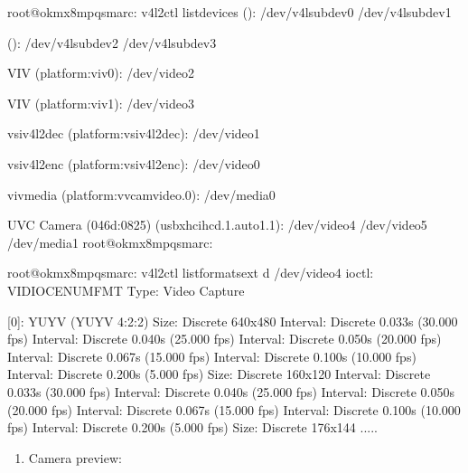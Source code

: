 \documentclass[letterpaper,10pt,openany,english]{sphinxmanual}
\begin{document}
\begin{sphinxVerbatim}[commandchars=\\\{\}]
root@ok\PYGZhy{}mx8mpq\PYGZhy{}smarc:\PYGZti{}\PYGZsh{} v4l2\PYGZhy{}ctl \PYGZhy{}\PYGZhy{}list\PYGZhy{}devices
 ():
        /dev/v4l\PYGZhy{}subdev0
        /dev/v4l\PYGZhy{}subdev1

 ():
        /dev/v4l\PYGZhy{}subdev2
        /dev/v4l\PYGZhy{}subdev3

VIV (platform:viv0):
        /dev/video2

VIV (platform:viv1):
        /dev/video3

vsi\PYGZus{}v4l2dec (platform:vsi\PYGZus{}v4l2dec):
        /dev/video1

vsi\PYGZus{}v4l2enc (platform:vsi\PYGZus{}v4l2enc):
        /dev/video0

viv\PYGZus{}media (platform:vvcam\PYGZhy{}video.0):
        /dev/media0

UVC Camera (046d:0825) (usb\PYGZhy{}xhci\PYGZhy{}hcd.1.auto\PYGZhy{}1.1):
        /dev/video4
        /dev/video5
        /dev/media1
root@ok\PYGZhy{}mx8mpq\PYGZhy{}smarc:\PYGZti{}\PYGZsh{} 

root@ok\PYGZhy{}mx8mpq\PYGZhy{}smarc:\PYGZti{}\PYGZsh{} v4l2\PYGZhy{}ctl \PYGZhy{}\PYGZhy{}list\PYGZhy{}formats\PYGZhy{}ext \PYGZhy{}d /dev/video4
ioctl: VIDIOC\PYGZus{}ENUM\PYGZus{}FMT
        Type: Video Capture

        [0]: \PYGZsq{}YUYV\PYGZsq{} (YUYV 4:2:2)
                Size: Discrete 640x480
                        Interval: Discrete 0.033s (30.000 fps)
                        Interval: Discrete 0.040s (25.000 fps)
                        Interval: Discrete 0.050s (20.000 fps)
                        Interval: Discrete 0.067s (15.000 fps)
                        Interval: Discrete 0.100s (10.000 fps)
                        Interval: Discrete 0.200s (5.000 fps)
                Size: Discrete 160x120
                        Interval: Discrete 0.033s (30.000 fps)
                        Interval: Discrete 0.040s (25.000 fps)
                        Interval: Discrete 0.050s (20.000 fps)
                        Interval: Discrete 0.067s (15.000 fps)
                        Interval: Discrete 0.100s (10.000 fps)
                        Interval: Discrete 0.200s (5.000 fps)
                Size: Discrete 176x144
.....
\end{sphinxVerbatim}
\begin{enumerate}
%
\item {} 
\sphinxAtStartPar
Camera preview:

\end{enumerate}
\end{document}
